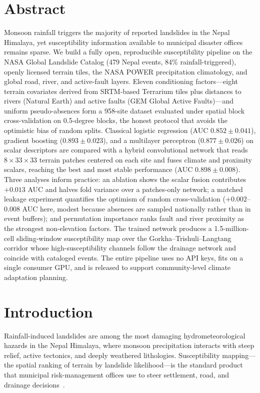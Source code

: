 \documentclass[11pt,a4paper]{article}
\begin{document}
\section*{Abstract}
Monsoon rainfall triggers the majority of reported landslides in the Nepal
Himalaya, yet susceptibility information available to municipal disaster
offices remains sparse. We build a fully open, reproducible susceptibility
pipeline on the NASA Global Landslide Catalog (479 Nepal events, 84\%
rainfall-triggered), openly licensed terrain tiles, the NASA POWER precipitation
climatology, and global road, river, and active-fault layers. Eleven
conditioning factors---eight terrain covariates derived from SRTM-based
Terrarium tiles plus distances to rivers (Natural Earth) and active faults (GEM
Global Active Faults)---and uniform pseudo-absences form a 958-site dataset
evaluated under spatial block cross-validation on 0.5-degree blocks, the honest
protocol that avoids the optimistic bias of random splits. Classical logistic
regression (AUC $0.852 \pm 0.041$), gradient boosting ($0.893 \pm 0.023$), and a
multilayer perceptron ($0.877 \pm 0.026$) on scalar descriptors are compared
with a hybrid convolutional network that reads $8 \times 33 \times 33$ terrain
patches centered on each site and fuses climate and proximity scalars, reaching
the best and most stable performance (AUC $0.898 \pm 0.008$). Three analyses
inform practice: an ablation shows the scalar fusion contributes $+0.013$ AUC
and halves fold variance over a patches-only network; a matched leakage
experiment quantifies the optimism of random cross-validation ($+0.002$--$0.008$
AUC here, modest because absences are sampled nationally rather than in event
buffers); and permutation importance ranks fault and river proximity as the
strongest non-elevation factors. The trained network produces a
1.5-million-cell sliding-window susceptibility map over the
Gorkha--Trishuli--Langtang corridor whose high-susceptibility channels follow
the drainage network and coincide with cataloged events. The entire pipeline
uses no API keys, fits on a single consumer GPU, and is released to support
community-level climate adaptation planning.

\section{Introduction}
\label{sec:intro}
Rainfall-induced landslides are among the most damaging hydrometeorological
hazards in the Nepal Himalaya, where monsoon precipitation interacts with steep
relief, active tectonics, and deeply weathered lithologies. Susceptibility
mapping---the spatial ranking of terrain by landslide likelihood---is the
standard product that municipal risk-management offices use to steer
settlement, road, and drainage decisions~\cite{reichenbach2018}.
\end{document}
